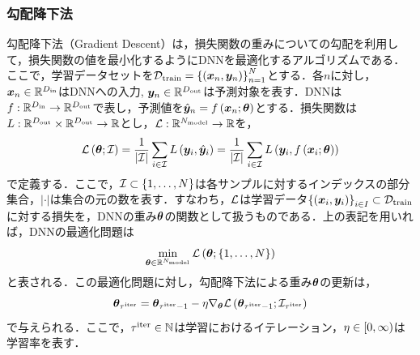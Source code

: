 \documentclass[12pt]{jarticle}
\numberwithin{equation}{section}    %
\numberwithin{figure}{section}      %
\numberwithin{table}{section}      %
\begin{document}
\subsubsection{勾配降下法}
\label{sec3:sec:gradient_descent}
勾配降下法（Gradient Descent）は，損失関数の重みについての勾配を利用して，損失関数の値を最小化するようにDNNを最適化するアルゴリズムである．ここで，学習データセットを$\mathcal{D}_{\text{train}} = \left\{\left(\bm{x}_{n}, \bm{y}_{n}\right)\right\}_{n = 1}^{N}$とする．各$n$に対し，$\bm{x}_{n} \in \mathbb{R}^{D_{\text{in}}}$はDNNへの入力, $\bm{y}_{n} \in \mathbb{R}^{D_{\text{out}}}$は予測対象を表す．DNNは$f: \mathbb{R}^{D_{\text{in}}} \to \mathbb{R}^{D_{\text{out}}}$で表し，予測値を$\hat{\bm{y}}_{n} = f\left(\bm{x}_{n}; \bm{\theta}\right)$とする．損失関数は$L: \mathbb{R}^{D_{\text{out}}} \times \mathbb{R}^{D_{\text{out}}} \to \mathbb{R}$とし，$\mathcal{L}: \mathbb{R}^{N_{\text{model}}} \to \mathbb{R}$を，
\begin{equation}
    \mathcal{L}\left(\bm{\theta}; \mathcal{I}\right) = \frac{1}{|\mathcal{I}|} \sum_{i \in \mathcal{I}} L\left(\bm{y}_{i}, \hat{\bm{y}}_{i}\right) = \frac{1}{|\mathcal{I}|} \sum_{i \in \mathcal{I}} L\left(\bm{y}_{i}, f\left(\bm{x}_{i}; \bm{\theta}\right)\right)
\end{equation}
で定義する．ここで，$\mathcal{I} \subset \{1, \ldots, N\}$は各サンプルに対するインデックスの部分集合，$|\cdot|$は集合の元の数を表す．すなわち，$\mathcal{L}$は学習データ$\left\{\left(\bm{x}_{i}, \bm{y}_{i}\right)\right\}_{i \in I} \subset \mathcal{D}_{\text{train}}$に対する損失を，DNNの重み$\bm{\theta}$の関数として扱うものである．上の表記を用いれば，DNNの最適化問題は
\begin{equation}
    \min_{\bm{\theta} \in \mathbb{R}^{N_{\text{model}}}} \mathcal{L}\left(\bm{\theta}; \{1, \ldots, N\}\right)
\end{equation}
と表される．この最適化問題に対し，勾配降下法による重み$\bm{\theta}$の更新は，
\begin{equation}
    \label{sec3:eq:normal_gradient_descent}
    \bm{\theta}_{\tau^{\text{iter}}} = \bm{\theta}_{\tau^{\text{iter}} - 1} - \eta \nabla_{\bm{\theta}} \mathcal{L}\left(\bm{\theta}_{\tau^{\text{iter}} - 1}; \mathcal{I}_{\tau^{\text{iter}}}\right)
\end{equation}
で与えられる．ここで，$\tau^{\text{iter}} \in \mathbb{N}$は学習におけるイテレーション，$\eta \in \left[0, \infty\right)$は学習率を表す．
\end{document}
